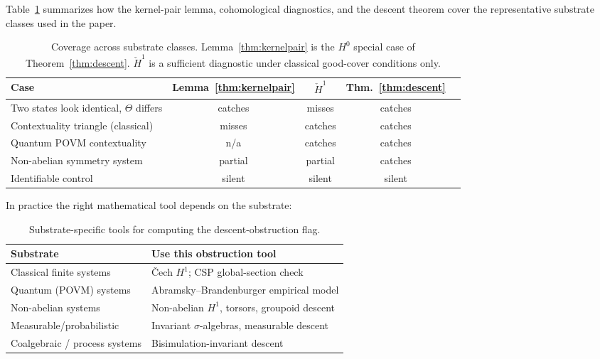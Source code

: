 \documentclass[11pt]{article}
\begin{document}
Table~\ref{tab:coverage} summarizes how the kernel-pair lemma, cohomological
diagnostics, and the descent theorem cover the representative substrate
classes used in the paper.

\begin{table}[H]
\centering
\renewcommand{\arraystretch}{1.3}
\begin{tabular}{lcccc}
\toprule
Case & Lemma~\ref{thm:kernelpair} & $\check H^1$ & Thm.~\ref{thm:descent} \\
\midrule
Two states look identical, $\Theta$ differs & catches & misses & catches \\
Contextuality triangle (classical)           & misses  & catches & catches \\
Quantum POVM contextuality                   & n/a     & catches & catches \\
Non-abelian symmetry system                  & partial & partial & catches \\
Identifiable control                         & silent  & silent  & silent  \\
\bottomrule
\end{tabular}
\caption{Coverage across substrate classes.
Lemma~\ref{thm:kernelpair} is the $H^0$ special case of
Theorem~\ref{thm:descent}.
$\check{H}^1$ is a sufficient diagnostic under classical good-cover
conditions only.}
\label{tab:coverage}
\end{table}

In practice the right mathematical tool depends on the substrate:

\begin{table}[H]
\centering
\renewcommand{\arraystretch}{1.3}
\begin{tabular}{lp{8cm}}
\toprule
Substrate & Use this obstruction tool \\
\midrule
Classical finite systems      & \v{C}ech $H^1$; CSP global-section check \\
Quantum (POVM) systems        & Abramsky--Brandenburger empirical model \citep{abramsky2011} \\
Non-abelian systems           & Non-abelian $H^1$, torsors, groupoid descent \\
Measurable/probabilistic      & Invariant $\sigma$-algebras, measurable descent \\
Coalgebraic / process systems & Bisimulation-invariant descent \\
\bottomrule
\end{tabular}
\caption{Substrate-specific tools for computing the descent-obstruction flag.}
\label{tab:substrates}
\end{table}
\end{document}
